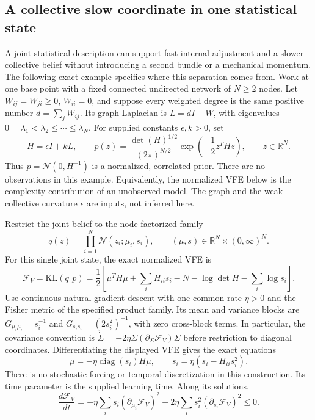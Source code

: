 \subsection{A collective slow coordinate in one statistical state}
\label{sec:slow_collective_memory_graph}

A joint statistical description can support fast internal adjustment and a slower collective belief without introducing a second bundle or a mechanical momentum. The following exact example specifies where this separation comes from. Work at one base point with a fixed connected undirected network of $N\geq2$ nodes. Let $W_{ij}=W_{ji}\geq0$, $W_{ii}=0$, and suppose every weighted degree is the same positive number $d=\sum_jW_{ij}$. Its graph Laplacian is $L=dI-W$, with eigenvalues $0=\lambda_1<\lambda_2\leq\cdots\leq\lambda_N$. For supplied constants $\epsilon,k>0$, set
\begin{equation}
 H=\epsilon I+kL,\qquad
 p(z)=\frac{\det(H)^{1/2}}{(2\pi)^{N/2}}
       \exp\left(-\frac12z^THz\right),\qquad z\in\mathbb R^N.
 \label{eq:collective_memory_target}
\end{equation}
Thus $p=\mathcal N(0,H^{-1})$ is a normalized, correlated prior. There are no observations in this example. Equivalently, the normalized VFE below is the complexity contribution of an unobserved model. The graph and the weak collective curvature $\epsilon$ are inputs, not inferred here.

Restrict the joint belief to the node-factorized family
\begin{equation}
 q(z)=\prod_{i=1}^N\mathcal N(z_i;\mu_i,s_i),\qquad
 (\mu,s)\in\mathbb R^N\times(0,\infty)^N.
 \label{eq:collective_memory_family}
\end{equation}
For this single joint state, the exact normalized VFE is
\begin{equation}
 \mathcal F_V=\mathrm{KL}(q\Vert p)
 =\frac12\left[
   \mu^TH\mu+\sum_iH_{ii}s_i-N
   -\log\det H-\sum_i\log s_i
 \right].
 \label{eq:collective_memory_vfe}
\end{equation}
Use continuous natural-gradient descent with one common rate $\eta>0$ and the Fisher metric of the specified product family. Its mean and variance blocks are $G_{\mu_i\mu_i}=s_i^{-1}$ and $G_{s_is_i}=(2s_i^2)^{-1}$, with zero cross-block terms. In particular, the covariance convention is $\dot\Sigma=-2\eta\Sigma(\partial_\Sigma\mathcal F_V)\Sigma$ before restriction to diagonal coordinates. Differentiating the displayed VFE gives the exact equations
\begin{equation}
 \dot\mu=-\eta\operatorname{diag}(s_i)H\mu,\qquad
 \dot s_i=\eta(s_i-H_{ii}s_i^2).
 \label{eq:collective_memory_flow}
\end{equation}
There is no stochastic forcing or temporal discretization in this construction. Its time parameter is the supplied learning time. Along its solutions,
\begin{equation}
 \frac{d\mathcal F_V}{dt}
 =-\eta\sum_i s_i(\partial_{\mu_i}\mathcal F_V)^2
   -2\eta\sum_i s_i^2(\partial_{s_i}\mathcal F_V)^2\leq0.
 \label{eq:collective_memory_dissipation}
\end{equation}

